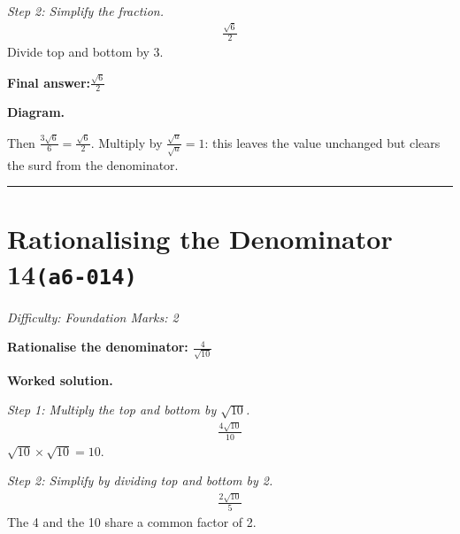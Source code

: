 \documentclass[11pt]{article}
\newcommand{\question}[1]{\par\medskip\noindent\textbf{#1}\par}
\begin{document}
\textit{Step 2: Simplify the fraction.}
\[\begin{gathered}
\frac{\sqrt{6}}{2}
\end{gathered}\]
Divide top and bottom by 3.

\begin{answerbox}
\textbf{Final answer:}\quad \(\displaystyle \frac{\sqrt{6}}{2}\)
\end{answerbox}
\textbf{Diagram.}

\begin{center}
\end{center}
\small Then $\frac{3\sqrt6}{6}=\frac{\sqrt6}{2}$. Multiply by $\frac{\sqrt{a}}{\sqrt{a}}=1$: this leaves the value unchanged but clears the surd from the denominator.\normalsize

\medskip\hrule

\section*{Rationalising the Denominator 14\quad\small\texttt{(a6-014)}}
\textit{Difficulty: Foundation \quad\textbar\quad Marks: 2}

\question{Rationalise the denominator: \( \frac{4}{\sqrt{10}} \)}

\textbf{Worked solution.}

\textit{Step 1: Multiply the top and bottom by \( \sqrt{10} \).}
\[\begin{gathered}
\frac{4\sqrt{10}}{10}
\end{gathered}\]
\( \sqrt{10} \times \sqrt{10} = 10 \).

\textit{Step 2: Simplify by dividing top and bottom by 2.}
\[\begin{gathered}
\frac{2\sqrt{10}}{5}
\end{gathered}\]
The 4 and the 10 share a common factor of 2.
\end{document}
